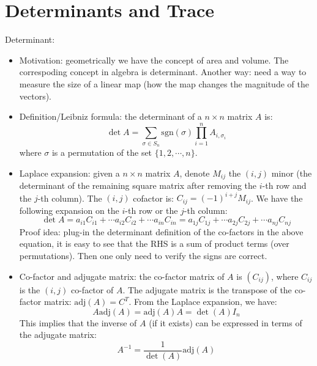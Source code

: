 \documentclass{report}
\begin{document}
\section{Determinants and Trace}
	
Determinant: 
\begin{itemize}
	\item Motivation: geometrically we have the concept of area and volume. The correspoding concept in algebra is determinant. Another way: need a way to measure the size of a linear map (how the map changes the magnitude of the vectors). 
	
	\item Definition/Leibniz formula: the determinant of a $n \times n$ matrix $A$ is: 
	\begin{equation}
	\det A = \sum_{\sigma \in S_n} \text{sgn}(\sigma) \prod_{i=1}^n A_{i,\sigma_i}	
	\end{equation}
	where $\sigma$ is a permutation of the set $\{1, 2, \cdots, n\}$. 
	
	\item Laplace expansion: given a $n \times n$ matrix $A$, denote $M_{ij}$ the $(i,j)$ minor (the determinant of the remaining square matrix after removing the $i$-th row and the $j$-th column). The $(i,j)$ cofactor is: $C_{ij} = (-1)^{i+j} M_{ij}$. We have the following expansion on the $i$-th row or the $j$-th column: 
	\begin{equation}
	\det A = a_{i1} C_{i1} + \cdots	a_{i2} C_{i2} + \cdots a_{in} C_{in} = a_{1j} C_{1j} + \cdots	a_{2j} C_{2j} + \cdots a_{nj} C_{nj}
	\end{equation}
	Proof idea: plug-in the determinant definition of the co-factors in the above equation, it is easy to see that the RHS is a sum of product terms (over permutations). Then one only need to verify the signs are correct. 
	
	\item Co-factor and adjugate matrix: the co-factor matrix of $A$ is $(C_{ij})$, where $C_{ij}$ is the $(i,j)$ co-factor of $A$. The adjugate matrix is the transpose of the co-factor matrix: $\text{adj}(A) = C^T$. From the Laplace expansion, we have: 
	\begin{equation}
	A \text{adj}(A) = \text{adj}(A) A = \det (A) I_n	
	\end{equation}
	This implies that the inverse of $A$ (if it exists) can be expressed in terms of the adjugate matrix: 
	\begin{equation}
	A^{-1} = \frac{1}{\det(A)} \text{adj}(A)
	\end{equation}
\end{itemize}
\end{document}
